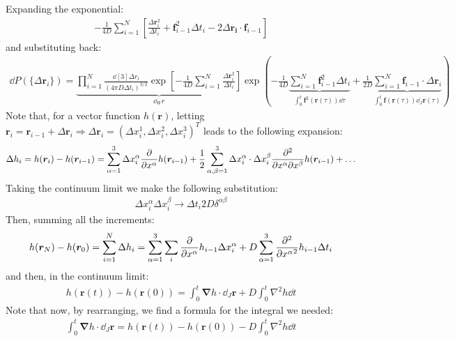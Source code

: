 \documentclass[../template.tex]{subfiles}
\begin{document}
Expanding the exponential:
\begin{align*}
    -\frac{1}{4D} \sum_{i=1}^N \left[\frac{\Delta \bm{r}_i^2}{\Delta t_i} + \bm{f}_{i-1}^2 \Delta t_i - 2 \Delta \bm{r_i} \cdot \bm{f}_{i-1} \right]
\end{align*}
and substituting back:
\begin{align*}
    \dd{P}(\{\Delta \bm{r}_i\}) = \underbrace{\prod_{i=1}^N \frac{\dd[3]{\Delta r_i}}{(4 \pi D \Delta t_i)^{3/2}} \exp\left[-\frac{1}{4D} \sum_{i=1}^N \frac{\Delta \bm{r}_i^2}{\Delta t_i}  \right] }_{\dd{_W r}}  \exp\left(-\frac{1}{4D} \underbrace{\sum_{i=1}^N \bm{f}_{i-1}^2 \Delta t_i}_{\displaystyle\int_0^t \bm{f}^2(\bm{r}(\tau)) \dd{\tau} }  + \frac{1}{2D} \underbrace{ \sum_{i=1}^N \bm{f}_{i-1} \cdot \Delta \bm{r}_i}_{\displaystyle \int_0^t \bm{f}(\bm{r}(\tau)) \dd{_J \bm{r}(\tau)}}  \right)
\end{align*}
Note that, for a vector function $h(\bm{r})$, letting $\bm{r}_i = \bm{r}_{i-1} + \Delta \bm{r}_i \Rightarrow \Delta \bm{r}_i = (\Delta x^1_i, \Delta x^2_i, \Delta x_i^3)^T$ leads to the following expansion:
\begin{align*}
    \Delta h_i = h(\bm{r}_i) - h(\bm{r}_{i-1}) = \sum_{\alpha =1}^3
 \Delta x_i^\alpha \pdv{x^\alpha} h(\bm{r}_{i-1}) + \frac{1}{2} \sum_{\alpha, \beta = 1}^3 \Delta x_i^\alpha \cdot \Delta x_i^\beta \pdv[2]{}{x^\alpha}{x^\beta} h(\bm{r}_{i-1}) + \dots \end{align*}  
Taking the continuum limit we make the following substitution:
\begin{align*}
    \Delta x_i^\alpha \Delta x_i^\beta \to \Delta t_i 2 D \delta^{\alpha \beta}
\end{align*}
Then, summing all the increments:
\begin{align*}
    h(\bm{r}_N) - h(\bm{r}_0) = \sum_{i=1}^N \Delta h_i = \sum_{\alpha = 1}^3 \sum_i \pdv{x^\alpha} h_{i-1} \Delta x_i^\alpha + D \sum_{\alpha =1}^3 \pdv[2]{{x^\alpha}} h_{i-1} \Delta t_i
 \end{align*}
 and then, in the continuum limit:
 \begin{align*}
     h(\bm{r}(t))- h(\bm{r}(0)) = \int_0^t \bm{\nabla} h \cdot \dd{_J \bm{r}} + D \int_0^t \nabla^2 h \dd{t}
 \end{align*}
 Note that now, by rearranging, we find a formula for the integral we needed:
 \begin{align*}
     \int_0^t \bm{\nabla} h \cdot \dd{_J \bm{r}} = h(\bm{r}(t)) - h(\bm{r}(0)) - D\int_0^t \nabla^2 h \dd{t}
 \end{align*}
\end{document}
